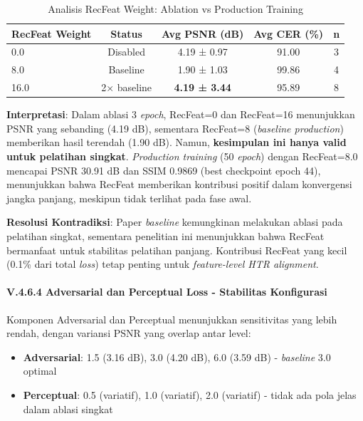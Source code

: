 \documentclass[12pt,a4paper]{article}
\begin{document}
\begin{table}[H]
\centering
\caption{Analisis RecFeat Weight: Ablation vs Production Training}
\label{tab:recfeat-sensitivity}
\footnotesize
\begin{tabular}{lcccc}
\hline
\textbf{RecFeat Weight} & \textbf{Status} & \textbf{Avg PSNR (dB)} & \textbf{Avg CER (\%)} & \textbf{n} \\
\hline
0.0 & Disabled & 4.19 ± 0.97 & 91.00 & 3 \\
8.0 & Baseline & 1.90 ± 1.03 & 99.86 & 4 \\
16.0 & 2× baseline & \textbf{4.19 ± 3.44} & 95.89 & 8 \\
\hline
\end{tabular}
\end{table}

\textbf{Interpretasi}: Dalam ablasi 3 \textit{epoch}, RecFeat=0 dan RecFeat=16 menunjukkan PSNR yang sebanding (4.19 dB), sementara RecFeat=8 (\textit{baseline production}) memberikan hasil terendah (1.90 dB). Namun, \textbf{kesimpulan ini hanya valid untuk pelatihan singkat}. \textit{Production training} (50 \textit{epoch}) dengan RecFeat=8.0 mencapai PSNR 30.91 dB dan SSIM 0.9869 (best checkpoint epoch 44), menunjukkan bahwa RecFeat memberikan kontribusi positif dalam konvergensi jangka panjang, meskipun tidak terlihat pada fase awal.

\textbf{Resolusi Kontradiksi}: Paper \textit{baseline} kemungkinan melakukan ablasi pada pelatihan singkat, sementara penelitian ini menunjukkan bahwa RecFeat bermanfaat untuk stabilitas pelatihan panjang. Kontribusi RecFeat yang kecil (0.1\% dari total \textit{loss}) tetap penting untuk \textit{feature-level HTR alignment}.

\paragraph{V.4.6.4 Adversarial dan Perceptual Loss - Stabilitas Konfigurasi}

Komponen Adversarial dan Perceptual menunjukkan sensitivitas yang lebih rendah, dengan variansi PSNR yang overlap antar level:

\begin{itemize}[leftmargin=*]
    \item \textbf{Adversarial}: 1.5 (3.16 dB), 3.0 (4.20 dB), 6.0 (3.59 dB) - \textit{baseline} 3.0 optimal
    \item \textbf{Perceptual}: 0.5 (variatif), 1.0 (variatif), 2.0 (variatif) - tidak ada pola jelas dalam ablasi singkat
\end{itemize}
\end{document}
